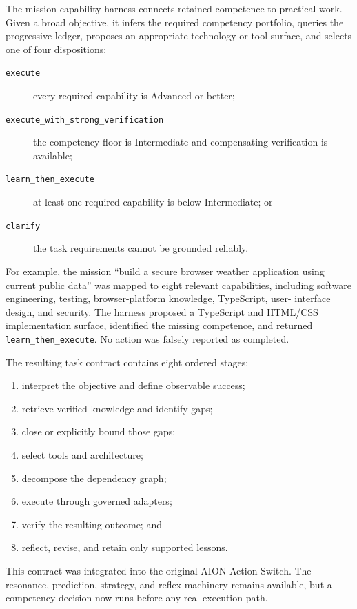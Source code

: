 The mission-capability harness connects retained competence to practical work.
Given a broad objective, it infers the required competency portfolio, queries
the progressive ledger, proposes an appropriate technology or tool surface,
and selects one of four dispositions:
\begin{description}
    \item[\texttt{execute}] every required capability is Advanced or better;
    \item[\texttt{execute\_with\_strong\_verification}] the competency floor is
          Intermediate and compensating verification is available;
    \item[\texttt{learn\_then\_execute}] at least one required capability is
          below Intermediate; or
    \item[\texttt{clarify}] the task requirements cannot be grounded reliably.
\end{description}

For example, the mission ``build a secure browser weather application using
current public data'' was mapped to eight relevant capabilities, including
software engineering, testing, browser-platform knowledge, TypeScript, user-
interface design, and security.  The harness proposed a TypeScript and
HTML/CSS implementation surface, identified the missing competence, and
returned \texttt{learn\_then\_execute}.  No action was falsely reported as
completed.

The resulting task contract contains eight ordered stages:
\begin{enumerate}
    \item interpret the objective and define observable success;
    \item retrieve verified knowledge and identify gaps;
    \item close or explicitly bound those gaps;
    \item select tools and architecture;
    \item decompose the dependency graph;
    \item execute through governed adapters;
    \item verify the resulting outcome; and
    \item reflect, revise, and retain only supported lessons.
\end{enumerate}
This contract was integrated into the original AION Action Switch.  The
resonance, prediction, strategy, and reflex machinery remains available, but a
competency decision now runs before any real execution path.

